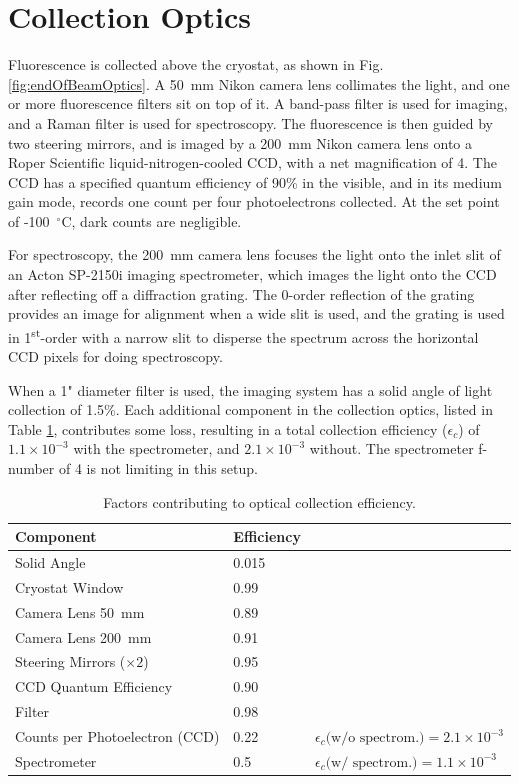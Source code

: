 
\section{Collection Optics}
\label{sec:collection}

Fluorescence is collected above the cryostat, as shown in Fig. \ref{fig:endOfBeamOptics}.  A 50~mm Nikon camera lens collimates the light, and one or more fluorescence filters sit on top of it.  A band-pass filter is used for imaging, and a Raman filter is used for spectroscopy.  The fluorescence is then guided by two steering mirrors, and is imaged by a 200~mm Nikon camera lens onto a Roper Scientific liquid-nitrogen-cooled CCD, with a net magnification of 4.  The CCD has a specified quantum efficiency of 90\% in the visible, and in its medium gain mode, records one count per four photoelectrons collected.  At the set point of -100~$^{\circ}$C, dark counts are negligible.

For spectroscopy, the 200~mm camera lens focuses the light onto the inlet slit of an Acton SP-2150i imaging spectrometer, which images the light onto the CCD after reflecting off a diffraction grating.  The 0-order reflection of the grating provides an image for alignment when a wide slit is used, and the grating is used in 1\textsuperscript{st}-order with a narrow slit to disperse the spectrum across the horizontal CCD pixels for doing spectroscopy.

When a 1" diameter filter is used, the imaging system has a solid angle of light collection of 1.5\%.  Each additional component in the collection optics, listed in Table \ref{table:colleff}, contributes some loss, resulting in a total collection efficiency ($\epsilon_{c}$) of $1.1 \times 10^{-3}$ with the spectrometer, and $2.1 \times 10^{-3}$ without.  The spectrometer f-number of 4 is not limiting in this setup.

\begin{table} [!htbp]
\caption{Factors contributing to optical collection efficiency.}
\label{table:colleff}
\begin{tabular}{l l l}
Component & Efficiency & \\
\hline
Solid Angle & 0.015 & \\
Cryostat Window & 0.99 & \\
Camera Lens 50~mm & 0.89 & \\
Camera Lens 200~mm & 0.91 & \\
Steering Mirrors ($\times 2$) & 0.95 & \\
CCD Quantum Efficiency & 0.90 & \\
Filter & 0.98 & \\
Counts per Photoelectron (CCD) & 0.22 & $\epsilon_{c}\text{(w/o spectrom.)} = 2.1 \times 10^{-3}$\\
\hline
Spectrometer & 0.5 & $\epsilon_{c}\text{(w/ spectrom.)} = 1.1 \times 10^{-3}$\\
\end{tabular}
\end{table}

